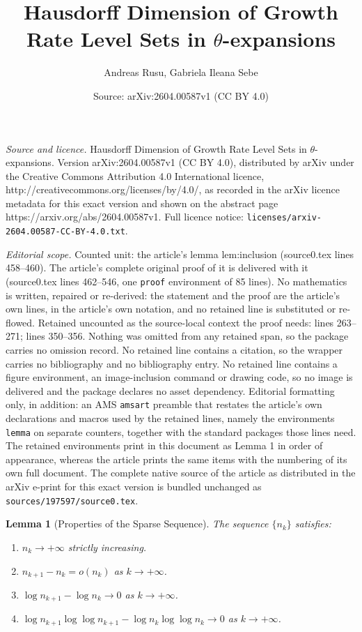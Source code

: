 \documentclass[10pt,a4paper]{amsart}
\title{Hausdorff Dimension of Growth Rate Level Sets in $\theta$-expansions}
\author{Andreas Rusu, Gabriela Ileana Sebe}
\date{Source: arXiv:2604.00587v1 (CC BY 4.0)}
\newtheorem{lemma}{Lemma}
\begin{document}
\maketitle

\noindent\emph{Source and licence.} Hausdorff Dimension of Growth Rate Level Sets in $\theta$-expansions. Version arXiv:2604.00587v1 (CC BY 4.0), distributed by arXiv under the Creative Commons Attribution 4.0 International licence, http://creativecommons.org/licenses/by/4.0/, as recorded in the arXiv licence metadata for this exact version and shown on the abstract page https://arxiv.org/abs/2604.00587v1. Full licence notice: \texttt{licenses/arxiv-2604.00587-CC-BY-4.0.txt}.\par\smallskip

\noindent\textit{Editorial scope.} Counted unit: the article's lemma lem:inclusion (source0.tex lines 458--460). The article's complete original proof of it is delivered with it (source0.tex lines 462--546, one \texttt{proof} environment of 85 lines). No mathematics is written, repaired or re-derived: the statement and the proof are the article's own lines, in the article's own notation, and no retained line is substituted or re-flowed.  Retained uncounted as the source-local context the proof needs: lines 263--271; lines 350--356.  Nothing was omitted from any retained span, so the package carries no omission record.  No retained line contains a citation, so the wrapper carries no bibliography and no bibliography entry.  No retained line contains a figure environment, an image-inclusion command or drawing code, so no image is delivered and the package declares no asset dependency.  Editorial formatting only, in addition: an AMS \texttt{amsart} preamble that restates the article's own declarations and macros used by the retained lines, namely the environments \texttt{lemma} on separate counters, together with the standard packages those lines need.  The retained environments print in this document as Lemma 1 in order of appearance, whereas the article prints the same items with the numbering of its own full document.  The complete native source of the article as distributed in the arXiv e-print for this exact version is bundled unchanged as \texttt{sources/197597/source0.tex}.
\begin{lemma}[Properties of the Sparse Sequence] \label{lem:sequence_properties}
The sequence $\{n_k\}$ satisfies:
\begin{enumerate}
\item[(a)] $n_k \to +\infty$ strictly increasing.
\item[(b)] $n_{k+1} - n_k = o(n_k)$ as $k \to +\infty$.
\item[(c)] $\log n_{k+1} - \log n_k \to 0$ as $k \to +\infty$.
\item[(d)] $\log n_{k+1} \log \log n_{k+1} - \log n_k \log \log n_k \to 0$ as $k \to +\infty$.
\end{enumerate}
\end{lemma}
\end{document}
